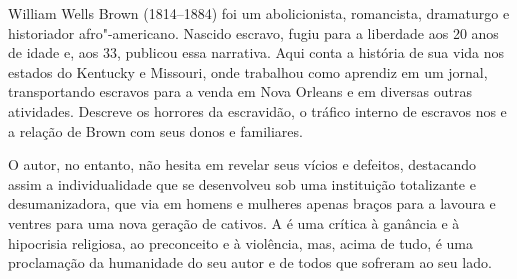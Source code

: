 \hspace*{-7cm}\hrulefill\hspace*{-7cm}

\medskip

\noindent{}William Wells Brown (1814--1884) foi um abolicionista, romancista, dramaturgo e historiador afro"-americano. Nascido escravo, fugiu para a liberdade aos 20 anos de idade e, aos 33, publicou essa narrativa. Aqui conta a história de sua vida nos estados do Kentucky e Missouri, onde trabalhou como aprendiz em um jornal, transportando escravos para a venda em Nova Orleans e em diversas outras atividades. Descreve os horrores da escravidão, o tráfico interno de escravos nos  e a relação de Brown com seus donos e familiares.

O autor, no entanto, não hesita em revelar seus vícios e defeitos, destacando assim a individualidade que se desenvolveu sob uma instituição totalizante e desumanizadora, que via em homens e mulheres apenas braços para a lavoura e ventres para uma nova geração de cativos. A {} é uma crítica à ganância e à hipocrisia religiosa, ao preconceito e à violência, mas, acima de tudo, é uma proclamação da humanidade do seu autor e de todos que sofreram ao seu lado.

\vfill

\hspace*{-.4cm}\begin{minipage}[c]{.5\linewidth}
\small{
{}}
\end{minipage}

\pagebreak

